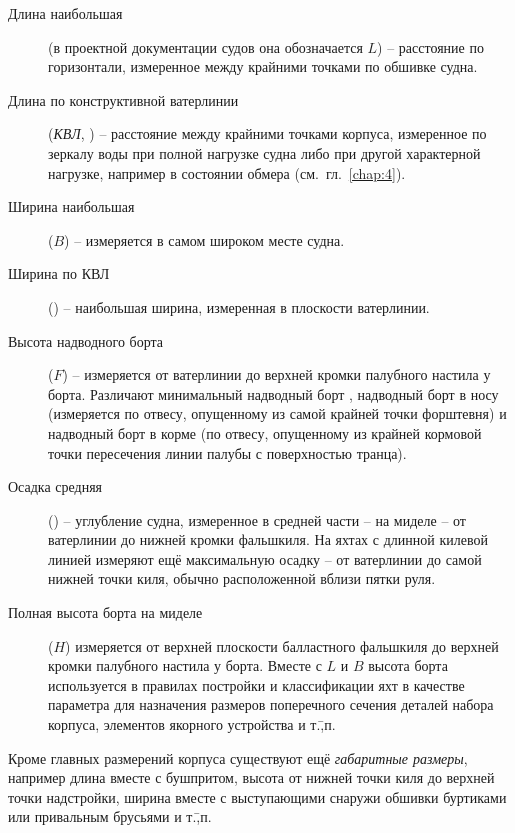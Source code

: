 \begin{description}
\item [Длина наибольшая] (в проектной
  документации судов она обозначается $L$) \--- расстояние по
  горизонтали, измеренное между крайними точками по обшивке судна.
\item [Длина по конструктивной ватерлинии]
  (\textit{КВЛ}, \lkvl) \--- расстояние
  между крайними точками корпуса, измеренное по зеркалу воды при
  полной нагрузке судна либо при другой характерной нагрузке, например
  в состоянии обмера (см.~гл.~\ref{chap:4}).
\item [Ширина наибольшая] ($B$) \---
  измеряется в самом широком месте судна.
\item [Ширина по КВЛ]
  (\bkvl) \--- наибольшая ширина, измеренная в плоскости ватерлинии.
\item [Высота надводного борта] ($F$)
  \--- измеряется от ватерлинии до верхней кромки палубного настила у
  борта. Различают минимальный надводный борт , надводный
  борт в носу  (измеряется по отвесу, опущенному из самой
  крайней точки форштевня) и надводный борт в корме  (по
  отвесу, опущенному из крайней кормовой точки пересечения линии
  палубы с поверхностью транца).
\item [Осадка средняя] (\tsr) \--- углубление
  судна, измеренное в средней части \--- на миделе \--- от ватерлинии
  до нижней кромки фальшкиля. На яхтах с длинной килевой линией
  измеряют ещё максимальную осадку \--- от ватерлинии до самой нижней
  точки киля, обычно расположенной вблизи пятки руля.
\item [Полная высота борта на миделе]
  ($H$) измеряется от верхней плоскости балластного
  фальшкиля до верхней кромки палубного настила у борта. Вместе с $L$
  и $B$ высота борта используется в правилах постройки и классификации
  яхт в качестве параметра для назначения размеров поперечного сечения
  деталей набора корпуса, элементов якорного устройства и т.\=,п.
\end{description}

Кроме главных размерений корпуса существуют ещё \textit{габаритные
размеры}, например длина вместе с бушпритом,
высота от нижней точки киля до верхней точки надстройки, ширина вместе
с выступающими снаружи обшивки буртиками или привальным брусьями и
т.\=,п.

